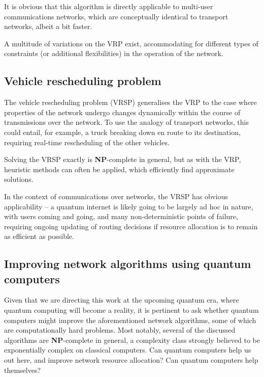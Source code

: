 It is obvious that this algorithm is directly applicable to multi-user communications networks, which are conceptually identical to transport networks, albeit a bit faster. 

A multitude of variations on the VRP exist, accommodating for different types of constraints (or additional flexibilities) in the operation of the network.

%
%

\subsection{Vehicle rescheduling problem} \label{sec:VRSP} 

The vehicle rescheduling problem (VRSP) generalises the VRP to the case where properties of the network undergo changes dynamically within the course of transmissions over the network. To use the analogy of transport networks, this could entail, for example, a truck breaking down en route to its destination, requiring real-time rescheduling of the other vehicles.

Solving the VRSP exactly is \textbf{NP}-complete in general, but as with the VRP, heuristic methods can often be applied, which efficiently find approximate solutions.

In the context of communications over networks, the VRSP has obvious applicability -- a quantum internet is likely going to be largely ad hoc in nature, with users coming and going, and many non-deterministic points of failure, requiring ongoing updating of routing decisions if resource allocation is to remain as efficient as possible.

%
%

\subsection{Improving network algorithms using quantum computers} 

Given that we are directing this work at the upcoming quantum era, where quantum computing will become a reality, it is pertinent to ask whether quantum computers might improve the aforementioned network algorithms, some of which are computationally hard problems. Most notably, several of the discussed algorithms are \textbf{NP}-complete in general, a complexity class strongly believed to be exponentially complex on classical computers. Can quantum computers help us out here, and improve network resource allocation? Can quantum computers help themselves?

